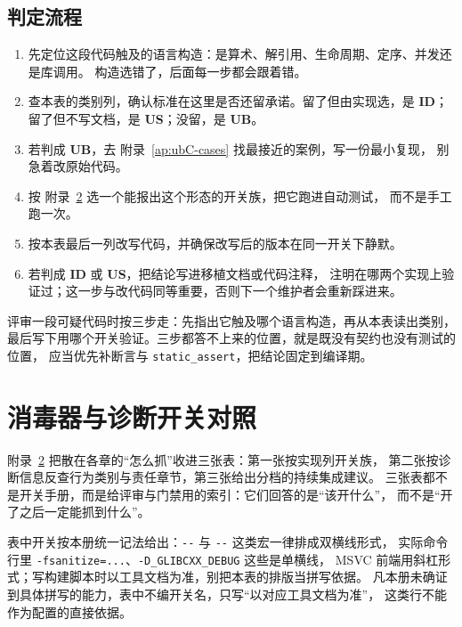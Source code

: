 \documentclass[12pt,a4paper,fontset=fandol]{ctexbook}
\newcommand{\Tp}[1]{\texttt{#1}}
\newcommand{\Opt}[1]{\texttt{-\/-#1}}
\newcommand{\Bk}{\discretionary{}{}{}}
\newcommand{\UB}{\textbf{\textsf{UB}}}
\newcommand{\IDB}{\textbf{\textsf{ID}}}
\newcommand{\USB}{\textbf{\textsf{US}}}
\newcommand{\Warn}[1]{\texttt{-\/-#1}}
\newcommand{\Mx}[1]{\textsf{#1}}
\begin{document}
\section{判定流程}

\begin{enumerate}
\item 先定位这段代码触及的语言构造：是算术、解引用、生命周期、定序、并发还是库调用。
构造选错了，后面每一步都会跟着错。
\item 查本表的类别列，确认标准在这里是否还留承诺。留了但由实现选，是 \IDB{}；
留了但不写文档，是 \USB{}；没留，是 \UB{}。
\item 若判成 \UB{}，去 附录~\ref{ap:ubC-cases} 找最接近的案例，写一份最小复现，
别急着改原始代码。
\item 按 附录~\ref{ap:ubB-switches} 选一个能报出这个形态的开关族，把它跑进自动测试，
而不是手工跑一次。
\item 按本表最后一列改写代码，并确保改写后的版本在同一开关下静默。
\item 若判成 \IDB{} 或 \USB{}，把结论写进移植文档或代码注释，
注明在哪两个实现上验证过；这一步与改代码同等重要，否则下一个维护者会重新踩进来。
\end{enumerate}

\begin{bestpractice}[title=把判定写进评审清单]
评审一段可疑代码时按三步走：先指出它触及哪个语言构造，再从本表读出类别，
最后写下用哪个开关验证。三步都答不上来的位置，就是既没有契约也没有测试的位置，
应当优先补断言与 \Tp{static\_assert}，把结论固定到编译期。
\end{bestpractice}

\chapter{消毒器与诊断开关对照}\label{ap:ubB-switches}

附录~\ref{ap:ubB-switches} 把散在各章的“怎么抓”收进三张表：第一张按实现列开关族，
第二张按诊断信息反查行为类别与责任章节，第三张给出分档的持续集成建议。
三张表都不是开关手册，而是给评审与门禁用的索引：它们回答的是“该开什么”，
而不是“开了之后一定能抓到什么”。

\begin{guideline}[title=记法与适用范围]
表中开关按本册统一记法给出：\Opt{} 与 \Warn{} 这类宏一律排成双横线形式，
实际命令行里 \Tp{-fsanitize=...}、\Tp{-D{\Bk}\_GLIBCXX{\Bk}\_DEBUG} 这些是单横线，
\Mx{MSVC} 前端用斜杠形式；写构建脚本时以工具文档为准，别把本表的排版当拼写依据。
凡本册未确证到具体拼写的能力，表中不编开关名，只写“以对应工具文档为准”，
这类行不能作为配置的直接依据。
\end{guideline}
\end{document}
